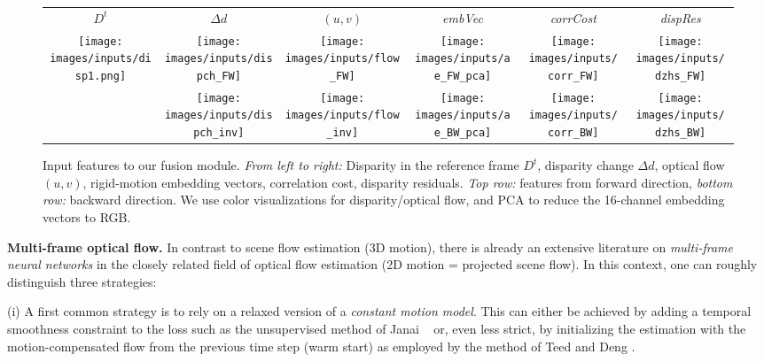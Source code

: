 \documentclass[10pt,twocolumn,letterpaper]{article}
\begin{document}
\begin{figure*}
    \centering
    {
    \setlength\tabcolsep{1pt}
    \begin{tabular}{cccccc}
    $D^t$ & $\Delta d$ & $(u,v)$ & \emph{embVec} & \emph{corrCost} & \emph{dispRes}
    \\
    \multirow{2}{*}{
    \texttt{[image: images/inputs/disp1.png]}
    }\hspace{-0.8mm}
    &
    \texttt{[image: images/inputs/dispch\_FW]}
    &
    \texttt{[image: images/inputs/flow\_FW]}
    &
    \texttt{[image: images/inputs/ae\_FW\_pca]}
    &
    \texttt{[image: images/inputs/corr\_FW]}
    &
    \texttt{[image: images/inputs/dzhs\_FW]}
    \\[-0.5mm]
    &
    \texttt{[image: images/inputs/dispch\_inv]}
    &
    \texttt{[image: images/inputs/flow\_inv]}
    &
    \texttt{[image: images/inputs/ae\_BW\_pca]}
    &
    \texttt{[image: images/inputs/corr\_BW]}
    &
    \texttt{[image: images/inputs/dzhs\_BW]}
    \end{tabular}
    \caption{Input features to our fusion module. \emph{From left to right:} Disparity in the reference frame $D^t$, disparity change $\Delta d$, optical flow $(u,v)$, rigid-motion embedding vectors, correlation cost, disparity residuals.
    \emph{Top row:} features from forward direction, \emph{bottom row:} backward direction.
    We use color visualizations for disparity/optical flow, and PCA to reduce the 16-channel embedding vectors to RGB.}
    \label{fig:inputs}
    }
\end{figure*}


\medskip
\noindent
\textbf{Multi-frame optical flow.}
In contrast to scene flow estimation (3D motion), there is already an extensive literature on \emph{multi-frame neural networks} in the closely related field of optical flow estimation 
(2D motion = projected scene flow). 
In this context, one can roughly distinguish three strategies:


(i) A first common strategy is to rely on a relaxed version of a \emph{constant motion model}. This can either be achieved by adding a temporal smoothness constraint to the loss such as the unsupervised method of Janai \etal~\cite{Janai2018_UnsupMultiframeOpticalFlow} or, even less strict, by initializing the estimation 
with the motion-compensated flow from the previous time step
(warm start) as employed by the method of Teed and Deng \cite{Teed2020_RAFT}.
\end{document}
